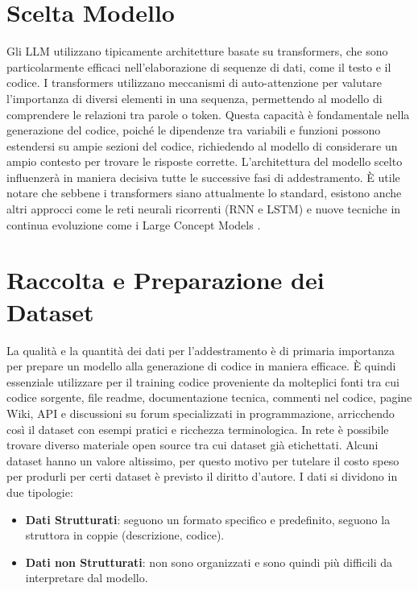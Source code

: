 \documentclass[12pt,a4paper,openright,twoside]{book}
\begin{document}
\section{Scelta Modello}
Gli LLM utilizzano tipicamente architetture basate su transformers, che sono particolarmente efficaci nell'elaborazione di sequenze di dati, come il testo e il codice.
I transformers utilizzano meccanismi di auto-attenzione per valutare l'importanza di diversi elementi in una sequenza,
permettendo al modello di comprendere le relazioni tra parole o token.
Questa capacità è fondamentale nella generazione del codice, poiché le dipendenze tra variabili e funzioni possono estendersi su ampie sezioni del codice, richiedendo al modello di considerare un ampio contesto per trovare le risposte corrette.
L'architettura del modello scelto influenzerà in maniera decisiva tutte le successive fasi di addestramento.
È utile notare che sebbene i transformers siano attualmente lo standard, esistono anche altri approcci come le reti neurali ricorrenti (RNN e LSTM) e nuove tecniche in continua evoluzione come i Large Concept Models \cite{code-llm-survey-2024}.
\section{Raccolta e Preparazione dei Dataset}
La qualità e la quantità dei dati per l'addestramento è di primaria importanza per prepare un modello alla generazione di codice in maniera efficace.
È quindi essenziale utilizzare per il training codice proveniente da molteplici fonti tra cui codice sorgente, file readme, documentazione tecnica, commenti nel codice,
pagine Wiki, API e discussioni su forum specializzati in programmazione, arricchendo così il dataset con esempi pratici e ricchezza terminologica.
In rete è possibile trovare diverso materiale open source tra cui dataset già etichettati.
Alcuni dataset hanno un valore altissimo, per questo motivo per tutelare il costo speso per produrli per certi dataset è previsto il diritto d'autore.
I dati si dividono in due tipologie:
\begin{itemize}
    \item \textbf{Dati Strutturati}: seguono un formato specifico e predefinito, seguono la struttora in coppie (descrizione, codice).
    \item \textbf{Dati non Strutturati}: non sono organizzati e sono quindi più difficili da interpretare dal modello. 
\end{itemize}
\end{document}
